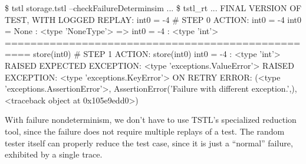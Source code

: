 {\scriptsize
\begin{code}
 \$ tstl storage.tstl --checkFailureDeterminsim
 ...
 \$ tstl\_rt
 ...
 FINAL VERSION OF TEST, WITH LOGGED REPLAY:
 int0 = -4                                   \# STEP 0
 ACTION: int0 = -4 
 int0 = None : <type 'NoneType'>
 => int0 = -4 : <type 'int'>
 ==================================================
 store(int0)                                 \# STEP 1
 ACTION: store(int0) 
 int0 = -4 : <type 'int'>
 RAISED EXPECTED EXCEPTION:
   <type 'exceptions.ValueError'> 
 RAISED EXCEPTION:
   <type 'exceptions.KeyError'>  ON RETRY
   ERROR: (<type 'exceptions.AssertionError'>,
   AssertionError('Failure with different exception.',),
 <traceback object at 0x105e9edd0>)
\end{code}
}

With failure nondeterminism, we don't have to use TSTL's specialized reduction
tool, since the failure does not require multiple replays of a test.
The random tester itself can properly reduce the test case, since it
is just a ``normal'' failure, exhibited by a single trace.